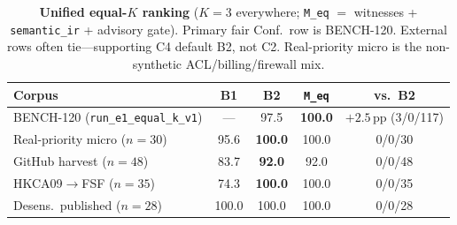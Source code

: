 \begin{table}[t]
  \centering
  \caption{\textbf{Unified equal-$K$ ranking} ($K{=}3$ everywhere;
    \texttt{M\_eq} $=$ witnesses + \texttt{semantic\_ir} + advisory gate).
    Primary fair Conf.\ row is BENCH-120.
    External rows often tie---supporting C4 default B2, not C2.
    Real-priority micro is the non-synthetic ACL/billing/firewall mix.}
  \label{tab:equal-k-unified}
  \footnotesize
  \renewcommand{\arraystretch}{1.12}
  \begin{tabular}{@{}lcccc@{}}
    \toprule
    Corpus & B1 & B2 & \texttt{M\_eq} & vs.\ B2 \\
    \midrule
    BENCH-120 (\texttt{run\_e1\_equal\_k\_v1})
      & --- & 97.5 & \textbf{100.0} & ${+}2.5$\,pp (3/0/117) \\
    Real-priority micro ($n{=}30$)
      & 95.6 & \textbf{100.0} & 100.0 & 0/0/30 \\
    GitHub harvest ($n{=}48$)
      & 83.7 & \textbf{92.0} & 92.0 & 0/0/48 \\
    HKCA09$\rightarrow$FSF ($n{=}35$)
      & 74.3 & \textbf{100.0} & 100.0 & 0/0/35 \\
    Desens.\ published ($n{=}28$)
      & 100.0 & 100.0 & 100.0 & 0/0/28 \\
    \bottomrule
  \end{tabular}
\end{table}
